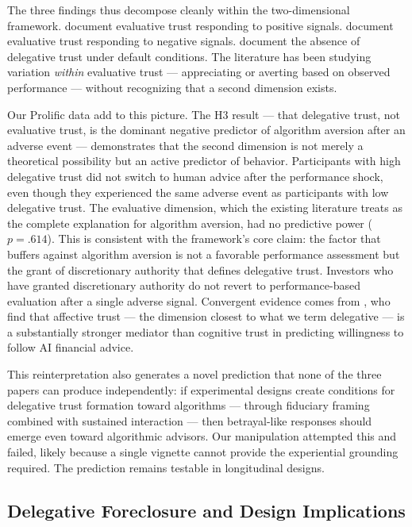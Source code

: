 The three findings thus decompose cleanly within the two-dimensional framework. \citet{LoggMinsonMoore2019} document evaluative trust responding to positive signals. \citet{DietvorstSimmonsMassey2015} document evaluative trust responding to negative signals. \citet{kormylo2026} document the absence of delegative trust under default conditions. The literature has been studying variation \emph{within} evaluative trust --- appreciating or averting based on observed performance --- without recognizing that a second dimension exists.

Our Prolific data add to this picture. The H3 result --- that delegative trust, not evaluative trust, is the dominant negative predictor of algorithm aversion after an adverse event --- demonstrates that the second dimension is not merely a theoretical possibility but an active predictor of behavior. Participants with high delegative trust did not switch to human advice after the performance shock, even though they experienced the same adverse event as participants with low delegative trust. The evaluative dimension, which the existing literature treats as the complete explanation for algorithm aversion, had no predictive power ($p = .614$). This is consistent with the framework's core claim: the factor that buffers against algorithm aversion is not a favorable performance assessment but the grant of discretionary authority that defines delegative trust. Investors who have granted discretionary authority do not revert to performance-based evaluation after a single adverse signal. Convergent evidence comes from \citet{HermannAlberhasky2026}, who find that affective trust --- the dimension closest to what we term delegative --- is a substantially stronger mediator than cognitive trust in predicting willingness to follow AI financial advice.

This reinterpretation also generates a novel prediction that none of the three papers can produce independently: if experimental designs create conditions for delegative trust formation toward algorithms --- through fiduciary framing combined with sustained interaction --- then betrayal-like responses should emerge even toward algorithmic advisors. Our manipulation attempted this and failed, likely because a single vignette cannot provide the experiential grounding required. The prediction remains testable in longitudinal designs.

\subsection{Delegative Foreclosure and Design Implications}
\label{sec:disc_foreclosure}

